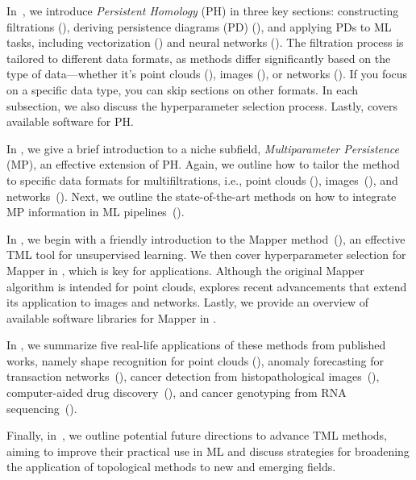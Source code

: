 In~, we introduce \textit{Persistent Homology} (PH) in three key sections: constructing filtrations (), deriving persistence diagrams (PD) (), and applying PDs to ML tasks, including vectorization () and neural networks (). The filtration process is tailored to different data formats, as methods differ significantly based on the type of data—whether it’s point clouds (), images (), or networks (). If you focus on a specific data type, you can skip sections on other formats. In each subsection, we also discuss the hyperparameter selection process. Lastly,  covers available software for PH. %

In , we give a brief introduction to a niche subfield, \textit{Multiparameter Persistence} (MP), an effective extension of PH. Again, we outline how to tailor the method to specific data formats for multifiltrations, i.e., point clouds (), images~(), and networks~(). Next, we outline the state-of-the-art methods on how to integrate MP information in ML pipelines~().

In , we begin with a friendly introduction to the Mapper method~(), an effective TML tool for unsupervised learning. We then cover hyperparameter selection for Mapper in , which is key for applications. Although the original Mapper algorithm is intended for point clouds,  explores recent advancements that extend its application to images and networks. Lastly, we provide an overview of available software libraries for Mapper in .

In , we summarize five real-life applications of these methods from published works, namely shape recognition for point clouds (), anomaly forecasting for transaction networks~(), cancer detection from histopathological images~(), computer-aided drug discovery~(), and cancer genotyping from RNA sequencing~().

Finally, in~, we outline potential future directions to advance TML methods, aiming to improve their practical use in ML and discuss strategies for broadening the application of topological methods to new and emerging fields.


 